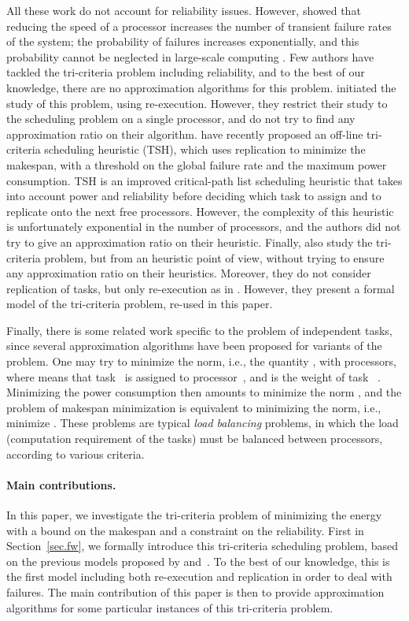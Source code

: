 \documentclass[a4paper]{article}
\theoremstyle{plain}
\theoremstyle{definition}
\theoremstyle{remark}
\begin{document}
All these work do not account for reliability issues. However,
\cite{Zhu04EEM} showed that reducing the speed of a processor
increases the number of transient failure rates of the system; the
probability of failures increases exponentially, and this probability
cannot be neglected in large-scale computing \cite{Oliner04}.  Few
authors have tackled the tri-criteria problem including reliability,
and to the best of our knowledge, there are no approximation
algorithms for this problem. \cite{Zhu06} initiated the study of this
problem, using re-execution. However, they restrict their study to the
scheduling problem on a single processor, and do not try to find any
approximation ratio on their algorithm. \cite{Assayad11} have
recently proposed an off-line tri-criteria scheduling heuristic (TSH),
which uses replication to minimize the makespan, with a
threshold on the global failure rate and the maximum power
consumption.  TSH is an improved critical-path list sche\-duling
heuristic that takes into account power and reliability before
deciding which task to assign and to replicate onto the next free
processors. However, the complexity of this heuristic is unfortunately
exponential in the number of processors, and the authors did not try
to give an approximation ratio on their heuristic.  Finally,
\cite{rr7757} also study the tri-criteria problem, but from an
heuristic point of view, without trying to ensure any approximation
ratio on their heuristics. Moreover, they do not consider replication
of tasks, but only re-execution as in \cite{Zhu06}.  However, they
present a formal model of the tri-criteria problem, re-used in this
paper.

Finally, there is some related work specific to the problem of
independent tasks, since several approximation algorithms have been
proposed for variants of the problem. One may try to minimize the
 norm, i.e., the quantity , with  processors, where  means that
task~ is assigned to processor~, and  is the weight of
task~ \cite{Alon97}.  Minimizing the power consumption
then amounts to minimize the  norm
\cite{RenaudGoudGreedy}, and the problem of makespan minimization is
equivalent to minimizing  
the  norm, i.e., minimize  \cite{Graham69,Ausiello99}.  These problems
are typical {\em load balancing} problems, in which the load
(computation requirement of the tasks) must be balanced between
processors, according to various criteria.




\paragraph{Main contributions.}  
In this paper, we investigate the tri-criteria problem of minimizing
the energy with a bound on the makespan and a constraint on the
reliability.  First in Section~\ref{sec.fw}, we formally introduce
this tri-criteria scheduling problem, based on the previous models
proposed by \cite{Zhu06} and~\cite{rr7757}.  To the best of our
knowledge, this is the first model including both re-execution and
replication in order to deal with failures. The main contribution of
this paper is then to provide approximation algorithms for some
particular instances of this tri-criteria problem.
\end{document}
